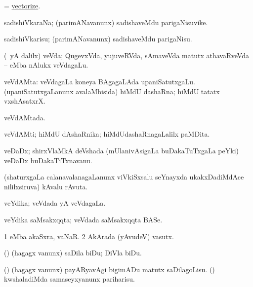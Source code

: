 \bentry
{} 
\gl{\sakirx}
\expl{}
\bmng
 = \hyperlink{vectorize}{vectorize}. 
\emng
\eentry

\bentry
{} 
\gl{\nA}
\expl{}
\bmng
 sadishiVkaraNa; (parimANavanunx) sadishaveMdu parigaNisuvike. 
\emng
\eentry

\bentry
{} 
\gl{\sakirx}
\expl{}
\bmng
 sadishiVkarisu; (parimANavanunx) sadishaveMdu parigaNisu. 
\emng
\eentry

\bentry
{} 
\gl{\nA}
\expl{}
\bmng
 (\Eva\ yA \bava dalilx) veVda; QugevxVda, yujuveRVda, sAmaveVda matutx athavaRveVda -- eMba nAlukx veVdagaLu. 
\emng
\eentry

\bentry
{} 
\gl{\nA}
\expl{}
\bmng
 veVdAMta: 
\banum
{} veVdagaLa koneya BAgagaLAda upaniSatutxgaLu. 
 (upaniSatutxgaLanunx avalaMbisida) hiMdU dashaRna; hiMdU tatatx vxshAsatxrX. 
\eanum
\emng
\eentry

\bentry
{} 
\gl{\gu}
\expl{}
\bmng
 veVdAMtada. 
\emng
\eentry

\bentry
{} 
\gl{\nA}
\expl{}
\bmng
 veVdAMti; hiMdU dAshaRnika; hiMdUdashaRnagaLalilx paMDita. 
\emng
\eentry

\bentry
{} 
\gl{\nA}
\expl{}
\bmng
 veDaDx; shirxVlaMkA deVshada (mUlanivAsigaLa buDakaTuTxgaLa peYki) veDaDx buDakaTiTxnavanu. 
\emng
\eentry

\bentry
{} 
\gl{\nA}
\expl{}
\bmng
 (shaturxgaLa calanavalanagaLanunx viVkiSxsalu seYnayxda ukakxDadiMdAce nililxsiruva) kAvalu rAvuta. 
\emng
\eentry

\bentry
{} 
\gl{\gu}
\expl{}
\bmng
 veYdika; veVdada yA veVdagaLa. 
\emng
\eentry

\bentry
{} 
\gl{\nA}
\expl{}
\bmng
 veYdika saMsakxqqta; veVdada saMsakxqqta BASe. 
\emng
\eentry

\bentry
{} 
\gl{\nA}
\expl{}
\bmng
\bnum
\num{1}  eMba akaSxra, vaNaR. 
\num{2} AkArada (yAvudeV) vasutx. 
\enum
\emng
\eentry

\bentry
{} 
\gl{\sakirx}
\expl{}
\bmng
(\nw) (hagagx \mo vanunx) saDila biDu; DiVla biDu. 
\emng

\noindent
\gl{\pagu}
\expl{}
\bmng
\banum
{} (\nw) (hagagx \mo vanunx) payARyavAgi bigimADu matutx saDilagoLisu. 
 (\rUpa) kwshaladiMda samaseyxyanunx pariharisu. 
\eanum
\emng
\eentry

